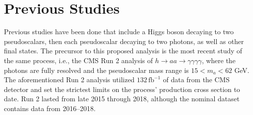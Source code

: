 \documentclass[12pt]{article}
\begin{document}

\section{Previous Studies}
Previous studies have been done that include a Higgs boson decaying to two pseudoscalars, then each pseudoscalar decaying to two photons, as well as other final states. The precursor to this proposed analysis is the most recent study of the same process, i.e., the CMS Run 2 analysis of $h\rightarrow aa \rightarrow \gamma\gamma\gamma\gamma$, where the photons are fully resolved and the pseudoscalar mass range is $15 < m_a < 62$ GeV. The aforementioned Run 2 analysis utilized $132\, \mathrm{fb}^{-1}$ of data from the CMS detector and set the strictest limits on the process' production cross section to date. Run 2 lasted from late 2015 through 2018, although the nominal dataset contains data from 2016--2018.\par
\end{document}
